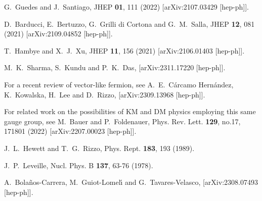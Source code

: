 \documentclass[14pt]{article}
\begin{document}
{\begin{thebibliography}{99}
G.~Guedes and J.~Santiago,
JHEP \textbf{01}, 111 (2022)
[arXiv:2107.03429 [hep-ph]].


D.~Barducci, E.~Bertuzzo, G.~Grilli di Cortona and G.~M.~Salla,
JHEP \textbf{12}, 081 (2021)
[arXiv:2109.04852 [hep-ph]].

T.~Hambye and X.~J.~Xu,
JHEP \textbf{11}, 156 (2021)
[arXiv:2106.01403 [hep-ph]].

M.~K.~Sharma, S.~Kundu and P.~K.~Das,
[arXiv:2311.17220 [hep-ph]].


For a recent review of vector-like fermion, see 
A.~E.~C\'arcamo Hern\'andez, K.~Kowalska, H.~Lee and D.~Rizzo,
[arXiv:2309.13968 [hep-ph]].


For related work on the possibilities of KM and DM physics employing this same gauge group, see 
M.~Bauer and P.~Foldenauer,
Phys. Rev. Lett. \textbf{129}, no.17, 171801 (2022)
[arXiv:2207.00023 [hep-ph]].


J.~L.~Hewett and T.~G.~Rizzo,
Phys. Rept. \textbf{183}, 193 (1989).

J.~P.~Leveille,
Nucl. Phys. B \textbf{137}, 63-76 (1978).


A.~Bola\~nos-Carrera, M.~Guiot-Lomel\'\i{} and G.~Tavares-Velasco,
[arXiv:2308.07493 [hep-ph]].


\end{thebibliography}}
\end{document}
